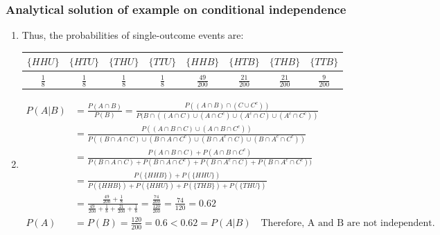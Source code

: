 \begin{frame}
    \frametitle{Analytical solution of example on conditional independence}

    \tiny
    \begin{enumerate}[a]

        \conti
        \item
            Thus, the probabilities of single-outcome events are:

            \setlength{\tabcolsep}{2pt}
            \begin{tabular}{|c|c|c|c|c|c|c|c|}
                \hline
                $\{HHU\}$ & $\{HTU\}$ & $\{THU\}$ & $\{TTU\}$ & $\{HHB\}$ & $\{HTB\}$ & $\{THB\}$ & $\{TTB\}$\\
                \hline\hline
                $\frac{1}{8}$ & $\frac{1}{8}$ & $\frac{1}{8}$ & $\frac{1}{8}$ & $\frac{49}{200}$ & $\frac{21}{200}$ & $\frac{21}{200}$ & $\frac{9}{200}$\\
                \hline
            \end{tabular}

        \item
            \begin{align*}
                P(A|B)&=\frac{P(A\cap B)}{P(B)}=
                \frac{P((A\cap B)\cap (C\cup C^c))}{P(B\cap ((A\cap C)\cup (A\cap C^c)\cup (A^c\cap C)\cup (A^c\cap C^c))}\\
                &=\frac{P((A\cap B\cap C)\cup (A\cap B\cap C^c))}{P((B\cap A\cap C)\cup (B\cap A\cap C^c)\cup (B\cap A^c\cap C)\cup (B\cap A^c\cap C^c))}\\
                &=\frac{P(A\cap B\cap C)+P(A\cap B\cap C^c)}{P(B\cap A\cap C)+P(B\cap A\cap C^c)+P(B\cap A^c\cap C)+P(B\cap A^c\cap C^c))}\\
                &=\frac{P(\{HHB\})+P(\{HHU\})}{P(\{HHB\})+P(\{HHU\})+P(\{THB\})+P(\{THU\})}\\
                &=\frac{\frac{49}{200}+\frac{1}{8}}{\frac{49}{200}+\frac{1}{8}+\frac{21}{200}+\frac{1}{8}}=\frac{\frac{74}{200}}{\frac{120}{200}}=\frac{74}{120}=0.62\\
                P(A)&=P(B)=\frac{120}{200}=0.6<0.62=P(A|B)\quad\text{Therefore, A and B are not independent.}
            \end{align*}
            \seti
    \end{enumerate}
    \normalsize

\end{frame}

